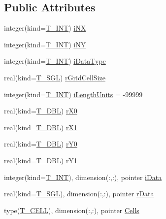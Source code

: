 \subsection*{Public Attributes}
\begin{DoxyCompactItemize}
\item 
integer(kind=\hyperlink{namespacetest_a6f91ebd89b58cfcc5da99faed9385c1e}{T\_\-INT}) \hyperlink{typetest_1_1_t___g_e_n_e_r_a_l___g_r_i_d_ab2d829428a9d4d65167e08b013867361}{iNX}
\item 
integer(kind=\hyperlink{namespacetest_a6f91ebd89b58cfcc5da99faed9385c1e}{T\_\-INT}) \hyperlink{typetest_1_1_t___g_e_n_e_r_a_l___g_r_i_d_ad7c0013f0d2da64df776b4c6638fd11d}{iNY}
\item 
integer(kind=\hyperlink{namespacetest_a6f91ebd89b58cfcc5da99faed9385c1e}{T\_\-INT}) \hyperlink{typetest_1_1_t___g_e_n_e_r_a_l___g_r_i_d_ac0322d5f29700b270476636dc2624cf0}{iDataType}
\item 
real(kind=\hyperlink{namespacetest_a04d8b9090502de3a00046fe904bc3d99}{T\_\-SGL}) \hyperlink{typetest_1_1_t___g_e_n_e_r_a_l___g_r_i_d_ad71744edf8415af44ccc4bab330dbe5f}{rGridCellSize}
\item 
integer(kind=\hyperlink{namespacetest_a6f91ebd89b58cfcc5da99faed9385c1e}{T\_\-INT}) \hyperlink{typetest_1_1_t___g_e_n_e_r_a_l___g_r_i_d_ac82de5d9a252574db8745abfa189694f}{iLengthUnits} = -\/99999
\item 
real(kind=\hyperlink{namespacetest_af379b935264d350d76bf75331181e241}{T\_\-DBL}) \hyperlink{typetest_1_1_t___g_e_n_e_r_a_l___g_r_i_d_ad0f63157f6f9ff937515f079f2c1af10}{rX0}
\item 
real(kind=\hyperlink{namespacetest_af379b935264d350d76bf75331181e241}{T\_\-DBL}) \hyperlink{typetest_1_1_t___g_e_n_e_r_a_l___g_r_i_d_a9483a92d88950ac9ae3fa5717118963a}{rX1}
\item 
real(kind=\hyperlink{namespacetest_af379b935264d350d76bf75331181e241}{T\_\-DBL}) \hyperlink{typetest_1_1_t___g_e_n_e_r_a_l___g_r_i_d_a35cb6a9594cace7980976521c4be9ae7}{rY0}
\item 
real(kind=\hyperlink{namespacetest_af379b935264d350d76bf75331181e241}{T\_\-DBL}) \hyperlink{typetest_1_1_t___g_e_n_e_r_a_l___g_r_i_d_a0f137476a138c34931d99f5d839c31ca}{rY1}
\item 
integer(kind=\hyperlink{namespacetest_a6f91ebd89b58cfcc5da99faed9385c1e}{T\_\-INT}), dimension(:,:), pointer \hyperlink{typetest_1_1_t___g_e_n_e_r_a_l___g_r_i_d_a1df76462828d260cc7ea860f42fc401c}{iData}
\item 
real(kind=\hyperlink{namespacetest_a04d8b9090502de3a00046fe904bc3d99}{T\_\-SGL}), dimension(:,:), pointer \hyperlink{typetest_1_1_t___g_e_n_e_r_a_l___g_r_i_d_a56e93920405fa6405c8ab5af1e60329e}{rData}
\item 
type(\hyperlink{typetest_1_1_t___c_e_l_l}{T\_\-CELL}), dimension(:,:), pointer \hyperlink{typetest_1_1_t___g_e_n_e_r_a_l___g_r_i_d_ac9e367fb03b74d49eca1577e132ea89c}{Cells}
\end{DoxyCompactItemize}


